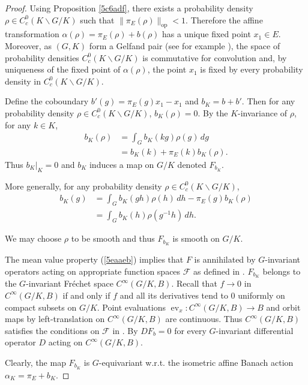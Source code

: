 \documentclass[12pt]{amsart}
\theoremstyle{definition}
\begin{document}
\begin{proof}
Using Proposition \ref{5c6adf}, there exists a probability density
\(\rho \in C^{0}_{c}(K\backslash G/K)\) such that
\(\|\pi_{E}(\rho)\|_{\mathrm{op}}<1\). Therefore the affine
transformation \(\alpha(\rho)=\pi_{E}(\rho)+b(\rho)\) has a unique fixed
point \(x_1\in E\). Moreover, as \((G,K)\) form a Gelfand pair (see for
example \cite[Proposition~6.1.3]{Dijk2009}), the space of probability
densities \(C^{0}_{c}(K\backslash G/K)\) is commutative for convolution
and, by uniqueness of the fixed point of \(\alpha(\rho)\), the point
\(x_1\) is fixed by every probability density in
\(C^{0}_{c}(K\backslash G/K)\).

Define the coboundary \(b'(g) = \pi_{E}(g)x_{1} - x_{1}\) and
\(b_{K} = b + b'\). Then for any probability density
\(\rho \in C^{0}_{c}(K\backslash G/K)\), \(b_{K}(\rho) = 0\). By the
\(K\)-invariance of \(\rho\), for any \(k \in K\), \[
\begin{split}
b_{K}(\rho) &= \int_{G} b_{K}(kg)\rho(g)\,dg \\
&= b_{K}(k) + \pi_{E}(k) b_{K}(\rho).
\end{split}
\] Thus \(b_{K}|_{K} = 0\) and \(b_{K}\) induces a map on \(G/K\)
denoted \(F_{b_{K}}\).

More generally, for any probability density
\(\rho \in C^{0}_{c}(K\backslash G/K)\), \begin{equation}
\label{5eaaeb}
\begin{split}b_{K}(g) &= \int_{G} b_{K}(gh)\rho(h)\,dh - \pi_{E}(g) b_{K}(\rho)\\&=\int_G b_{K}(h) \rho(g^{-1}h)\,dh.\end{split}\end{equation}

We may choose \(\rho\) to be smooth and thus \(F_{b_{K}}\) is smooth on
\(G/K\).

The mean value property (\ref{5eaaeb}) implies that \(F\) is annihilated
by \(G\)-invariant operators acting on appropriate function spaces
\(\mathcal{F}\) as defined in \cite[pp.~156]{Bekka2008}. \(F_{b_{K}}\)
belongs to the \(G\)-invariant Fréchet space \(C^{\infty}(G/K,B)\).
Recall that \(f \to 0\) in \(C^{\infty}(G/K,B)\) if and only if \(f\)
and all its derivatives tend to \(0\) uniformly on compact subsets on
\(G/K\). Point evaluations
\(\operatorname{ev}_{x}: C^{\infty}(G/K,B) \to B\) and orbit maps by
left-translation on \(C^{\infty}(G/K,B)\) are continuous. Thus
\(C^{\infty}(G/K,B)\) satisfies the conditions on \(\mathcal{F}\) in
\cite[pp.~156]{Bekka2008}. By \cite[Proposition~3.3.8]{Bekka2008}
\(D F_b=0\) for every \(G\)-invariant differential operator \(D\) acting
on \(C^{\infty}(G/K,B)\).

Clearly, the map \(F_{b_{K}}\) is \(G\)-equivariant w.r.t. the isometric
affine Banach action \(\alpha_{K} = \pi_{E} + b_{K}\).

\end{proof}
\end{document}
